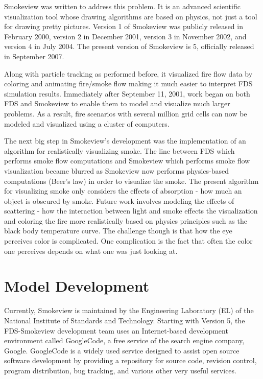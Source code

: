\documentclass[11pt,twoside]{book}
\begin{document}
Smokeview was written to address this problem. It is an advanced
scientific visualization tool whose drawing algorithms are based
on physics, not just a tool for drawing pretty pictures. Version 1
of Smokeview was publicly released in February 2000, version 2 in
December 2001, version 3 in November 2002, and version 4 in July
2004. The present version of Smokeview is 5, officially released
in September 2007.

Along with particle tracking as performed before, it visualized
fire flow data by coloring and animating fire/smoke flow making it
much easier to interpret FDS simulation results.  Immediately
after September 11, 2001, work began on both FDS and Smokeview to
enable them to model and visualize much larger problems.  As a
result, fire scenarios with several million grid cells can now be
modeled and visualized using a cluster of computers.

The next big step in Smokeview's development was the
implementation of an algorithm for realistically visualizing
smoke. The line between FDS which performs smoke flow computations
and Smokeview which performs smoke flow visualization became
blurred as Smokeview now performs physics-based computations
(Beer's law) in order to visualize the smoke.  The present
algorithm for visualizing smoke only considers the effects of
absorption - how much an object is obscured by smoke.  Future work
involves modeling the effects of scattering - how the interaction
between light and smoke effects the visualization and coloring the
fire more realistically based on physics principles such as the
black body temperature curve.  The challenge though is that how
the eye perceives color is complicated.  One complication is the
fact that often the color one perceives depends on what one was
just looking at.

%
%

\section{Model Development}
Currently, Smokeview is maintained by the Engineering Laboratory
(EL) of the National Institute of Standards and Technology.
Starting with Version 5, the FDS-Smokeview development team uses
an Internet-based development environment called GoogleCode, a
free service of the search engine company, Google. GoogleCode is a
widely used service designed to assist open source software
development by providing a repository for source code, revision
control, program distribution, bug tracking, and various other
very useful services.
\end{document}
